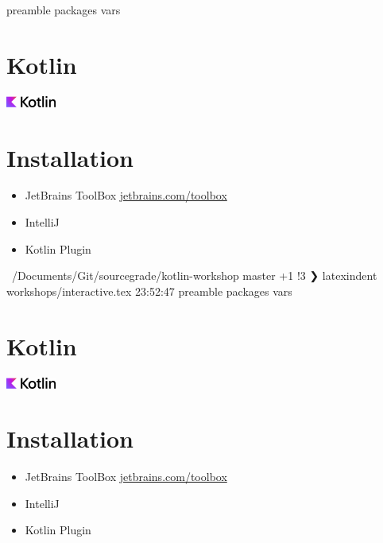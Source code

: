 \RequirePackage{import}
{preamble}
{packages}
{vars}


    \section{Kotlin}\label{sec:kotlin}
    \begin{frame}[c]
        \centering
        \Large
        \includegraphics[scale=3]{../pictures/Kotlin-logo-2021_svg-tex.pdf}
        \linebreak
    \end{frame}

    \section{Installation}\label{sec:installation}
    \begin{frame}
        \slidehead
        \begin{itemize}[<+->]
            \item JetBrains ToolBox \url{jetbrains.com/toolbox}
            \item IntelliJ
            \item Kotlin Plugin
        \end{itemize}
    \end{frame}

~/Documents/Git/sourcegrade/kotlin-workshop master +1 !3 ❯ latexindent workshops/interactive.tex 23:52:47
\RequirePackage{import}
{preamble}
{packages}
{vars}


    \section{Kotlin}\label{sec:kotlin}
    \begin{frame}[c]
        \centering
        \Large
        \includegraphics[scale=3]{../pictures/Kotlin-logo-2021_svg-tex.pdf}
        \linebreak
    \end{frame}

    \section{Installation}\label{sec:installation}
    \begin{frame}

        \slidehead
        \begin{itemize}[<+->]
            \item JetBrains ToolBox \url{jetbrains.com/toolbox}
            \item    IntelliJ
            \item Kotlin Plugin
        \end{itemize}
    \end{frame}

